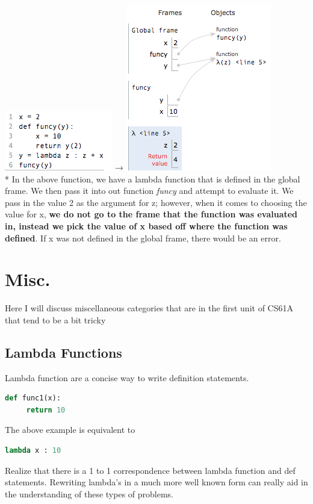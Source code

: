 \documentclass{article}
\begin{document}
\includegraphics[scale=.7]{../images/funcy1.png}{\Huge $\rightarrow$}\includegraphics[scale=.7]{../images/funcy2.png} \\* \bigskip
In the above function, we have a lambda function that is defined in the global frame. We then pass it into out function \emph{funcy} and attempt to evaluate it. We pass in the value 2 as the argument for z; however, when it comes to choosing the value for x, \textbf{we do not go to the frame that the function was evaluated in, instead we pick the value of x based off where the function was defined}. If x was not defined in the global frame, there would be an error. 
\section{Misc.}
Here I will discuss miscellaneous categories that are in the first unit of CS61A that tend to be a bit tricky
\subsection{Lambda Functions}
Lambda function are a concise way to write definition statements.
\begin{lstlisting}[language = Python]
def func1(x):
     return 10
\end{lstlisting}
The above example is equivalent to 
\begin{lstlisting}[language = Python]
lambda x : 10
\end{lstlisting}
Realize that there is a 1 to 1 correspondence between lambda function and def statements. Rewriting lambda's in a much more well known form can really aid in the understanding of these types of problems.
\end{document}
